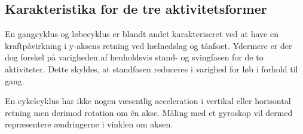 \subsection{Karakteristika for de tre aktivitetsformer}
En gangcyklus og løbecyklus er blandt andet karakteriseret ved at have en kraftpåvirkning i y-aksens retning ved hælnedslag og tåafsæt. Ydermere er der dog forskel på varigheden af henholdsvis stand- og svingfasen for de to aktiviteter. Dette skyldes, at standfasen reduceres i varighed for løb i forhold til gang. %

En cykelcyklus har ikke nogen væsentlig acceleration i vertikal eller horisontal retning men derimod rotation om én akse. Måling med et gyroskop vil dermed repræsentere ændringerne i vinklen om aksen. \citep{Cockcroft2011,Marin-PerianuMarin-Perianu2013}


